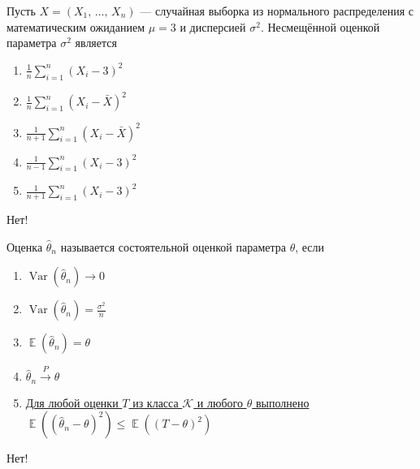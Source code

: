 \documentclass[t]{beamer}
\DeclareMathOperator{\Var}{Var}
\DeclareMathOperator{\E}{\mathbb{E}}
\begin{document}
 \begin{frame} \label{30-No} 
\begin{block}{30} 

  Пусть $X = (X_1, \, \ldots, \, X_n)$ — случайная выборка из нормального распределения с математическим ожиданием $\mu = 3$ и дисперсией $\sigma^2$. Несмещённой оценкой параметра $\sigma^2$ является


 \end{block} 
\begin{enumerate} 
\item[] \hyperlink{30-Yes}{\beamergotobutton{} $\frac{1}{n} \sum_{i=1}^{n}(X_i - 3)^2$}
\item[] \hyperlink{30-No}{\beamergotobutton{} $\frac{1}{n} \sum_{i=1}^{n}(X_i - \bar{X})^2$}
\item[] \hyperlink{30-No}{\beamergotobutton{} $\frac{1}{n+1} \sum_{i=1}^{n}(X_i - \bar{X})^2$}
\item[] \hyperlink{30-No}{\beamergotobutton{} $\frac{1}{n-1} \sum_{i=1}^{n}(X_i - 3)^2$}
\item[] \hyperlink{30-No}{\beamergotobutton{} $\frac{1}{n+1} \sum_{i=1}^{n}(X_i - 3)^2$}
\end{enumerate} 

 \alert{Нет!} 
\end{frame} 


 \begin{frame} \label{31-No} 
\begin{block}{31} 

  Оценка  $\hat\theta_n$ называется состоятельной оценкой параметра $\theta$, если


 \end{block} 
\begin{enumerate} 
\item[] \hyperlink{31-No}{\beamergotobutton{} $\Var(\hat\theta_n) \to 0$}
\item[] \hyperlink{31-No}{\beamergotobutton{} $\Var(\hat\theta_n)=\frac{\sigma^2}{n}$}
\item[] \hyperlink{31-No}{\beamergotobutton{} $\E(\hat\theta_n)=\theta$}
\item[] \hyperlink{31-Yes}{\beamergotobutton{} $\hat\theta_n \xrightarrow{P}\theta$}
\item[] \hyperlink{31-No}{\beamergotobutton{} Для любой оценки $T$ из класса $\mathcal{K}$ и любого $\theta$ выполнено $\E((\hat\theta_n-\theta)^2)\leq \E((T-\theta)^2)$}
\end{enumerate} 

 \alert{Нет!} 
\end{frame} 
\end{document}
